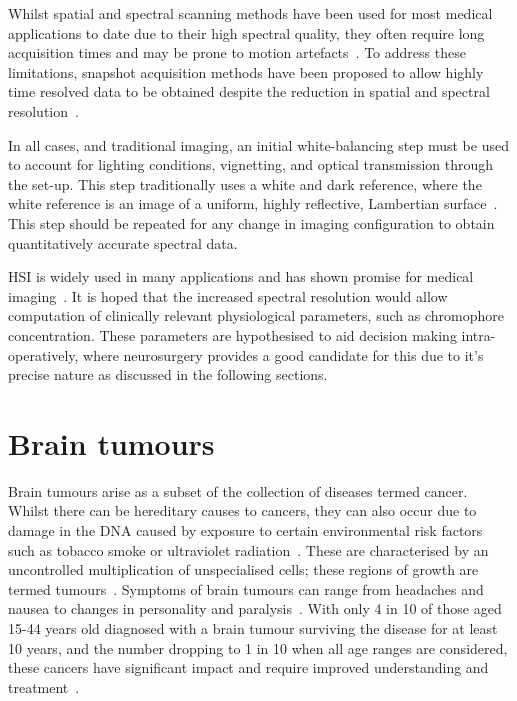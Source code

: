 Whilst spatial and spectral scanning methods have been used for most medical applications to date due to their high spectral quality, they often require long acquisition times and may be prone to motion artefacts~\cite{Kulcke2018, Giannoni2021, Shapey2019, Yoon2021}. To address these limitations, snapshot acquisition methods have been proposed to allow highly time resolved data to be obtained despite the reduction in spatial and spectral resolution~\cite{Ayala2021, Ebner2021}. 

In all cases, and traditional imaging, an initial white-balancing step must be used to account for lighting conditions, vignetting, and optical transmission through the set-up. This step traditionally uses a white and dark reference, where the white reference is an image of a uniform, highly reflective, Lambertian surface~\cite{Lu2014}. This step should be repeated for any change in imaging configuration to obtain quantitatively accurate spectral data. 

HSI is widely used in many applications and has shown promise for medical imaging~\cite{Lu2014,Giannoni2018,Calin2014,Shapey2019}. It is hoped that the increased spectral resolution would allow computation of clinically relevant physiological parameters, such as chromophore concentration. These parameters are hypothesised to aid decision making intra-operatively, where neurosurgery provides a good candidate for this due to it's precise nature as discussed in the following sections. 

\section{Brain tumours}
Brain tumours arise as a subset of the collection of diseases termed cancer. Whilst there can be hereditary causes to cancers, they can also occur due to damage in the DNA caused by exposure to certain environmental risk factors such as tobacco smoke or ultraviolet radiation~\cite{WorldHealthOrganisation2023}. These are characterised by an uncontrolled multiplication of unspecialised cells; these regions of growth are termed tumours~\cite{WorldHealthOrganisation2023}. Symptoms of brain tumours can range from headaches and nausea to changes in personality and paralysis~\cite{NationalHealthService2023}. With only 4 in 10 of those aged 15-44 years old diagnosed with a brain tumour surviving the disease for at least 10 years, and the number dropping to 1 in 10 when all age ranges are considered, these cancers have significant impact and require improved understanding and treatment~\cite{CancerResearchUK2023}.


